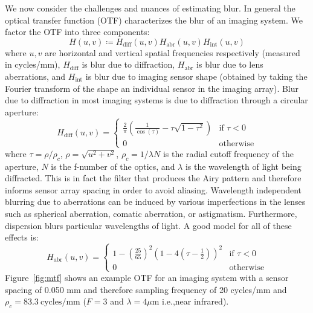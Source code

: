 We now consider the challenges and nuances of estimating blur.
%
In general the optical transfer function (OTF) characterizes the blur of an imaging system.
%
We factor the OTF into three components:
\begin{equation}
	H(u, v) \coloneqq H_{\text{diff}}(u,v) H_{\text{abr}}(u,v) H_{\text{int}} (u,v)
\end{equation}
where \(u,v\) are horizontal and vertical spatial frequencies respectively (measured in cycles/mm), \(H_{\text{diff}}\) is blur due to diffraction, \(H_{\text{abr}}\) is blur due to lens aberrations, and \(H_{\text{int}}\) is blur due to imaging sensor shape (obtained by taking the Fourier transform of the shape an individual sensor in the imaging array).
%
Blur due to diffraction in most imaging systems is due to diffraction through a circular aperture\cite{goodman2005introduction}:
\begin{equation*}
	H_{\text{diff}}(u,v) =   \begin{cases}
		\frac{2}{\pi} \left(\frac{1}{\cos(\tau)} - \tau \sqrt{1-\tau^2}\right) & \text{if } \tau < 0 \\
		0                                                                      & \text{otherwise}
	\end{cases}
\end{equation*}
where \(\tau = \rho/\rho_c\), \(\rho=\sqrt{u^2 +v^2}\), \(\rho_c = 1/\lambda N\) is the radial cutoff frequency of the aperture, \(N\) is the f-number of the optics, and \(\lambda\) is the wavelength of light being diffracted.
%
This is in fact the filter that produces the Airy pattern and therefore informs sensor array spacing in order to avoid aliasing.
%
Wavelength independent blurring due to aberrations can be induced by various imperfections in the lenses such as spherical aberration, comatic aberration, or astigmatism. Furthermore, dispersion blurs particular wavelengths of light. A good model for all of these effects is\cite{10.1117.12.946501}:
\begin{equation*}
	H_{\text{abr}}(u,v) =   \begin{cases}
		1-\left(\frac{25}{65}\right)^2 \left(1-4\left(\tau - \frac{1}{2}\right)\right)^2 & \text{if } \tau < 0 \\
		0                                                                                & \text{otherwise}
	\end{cases}
\end{equation*}
Figure~\ref{fig:mtf} shows an example OTF for an imaging system with a sensor spacing of 0.050 mm and therefore sampling frequency of 20 cycles/mm and \(\rho_c = 83.3~\text{cycles}/\text{mm}\) (\(F=3\) and \(\lambda = 4\mu\text{m}\) i.e.,near infrared).
